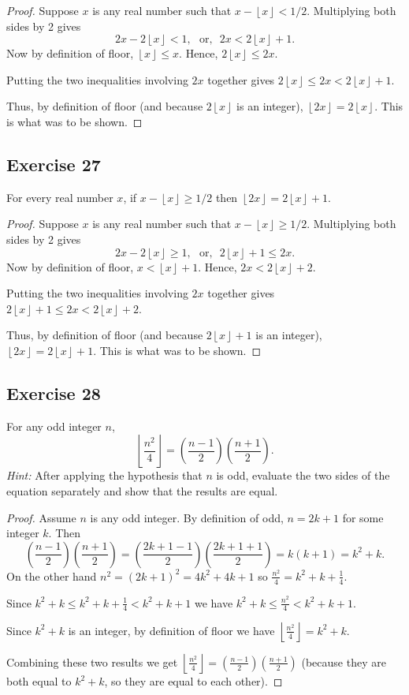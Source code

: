 \documentclass[14pt]{extarticle}
\newcommand{\dps}{\displaystyle}
\newcommand{\floor}[1]{{\left\lfloor#1\right\rfloor}}
\begin{document}
\begin{proof}
Suppose $x$ is any real number such that $x - \floor{x} < 1/2$. Multiplying both sides by 2 gives 
\[
2x - 2\floor{x} < 1, \,\,\text{ or, }\,\, 2x < 2\floor{x} + 1. 
\]
Now by definition of floor, $\floor{x} \leq x$. Hence, $2\floor{x} \leq 2x$. 

Putting the two inequalities involving $2x$ together gives $2\floor{x} \leq 2x < 2\floor{x} + 1$. 

Thus, by definition of floor (and because $2\floor{x}$ is an integer), $\floor{2x} = 2\floor{x}$. This is what was to be shown.
\end{proof}

\subsection{Exercise 27}
For every real number $x$, if $x - \floor{x} \geq 1/2$ then $\floor{2x} = 2\floor{x} + 1$.

\begin{proof}
Suppose $x$ is any real number such that $x - \floor{x} \geq 1/2$. Multiplying both sides by 2 gives 
\[
2x - 2\floor{x} \geq 1, \,\,\text{ or, }\,\, 2\floor{x}+1 \leq 2x. 
\]
Now by definition of floor, $x < \floor{x} + 1$. Hence, $2x < 2\floor{x} + 2$. 

Putting the two inequalities involving $2x$ together gives $2\floor{x} + 1 \leq 2x < 2\floor{x} + 2$. 

Thus, by definition of floor (and because $2\floor{x} + 1$ is an integer), $\floor{2x} = 2\floor{x} + 1$. This is what was to be shown.
\end{proof}

\subsection{Exercise 28}
For any odd integer $n$,
\[
\floor{\frac{n^2}{4}} = \left(\frac{n-1}{2}\right)\left(\frac{n+1}{2}\right).
\]
{\it Hint:} After applying the hypothesis that $n$ is odd, evaluate the two sides of the equation separately and show
that the results are equal.

\begin{proof}
Assume $n$ is any odd integer. By definition of odd, $n = 2k+1$ for some integer $k$. Then
\[
\left(\frac{n-1}{2}\right)\left(\frac{n+1}{2}\right) = \left(\frac{2k+1-1}{2}\right)\left(\frac{2k+1+1}{2}\right) = k(k+1) = k^2+k.
\]
On the other hand $n^2 = (2k+1)^2 = 4k^2+4k+1$ so $\frac{n^2}{4} = k^2+k+\frac{1}{4}$. 

Since $k^2+k \leq k^2+k+\frac{1}{4} < k^2+k+1$ we have $k^2+k \leq \frac{n^2}{4} < k^2+k+1$. 

Since $k^2+k$ is an integer, by definition of floor we have $\dps\floor{\frac{n^2}{4}} = k^2+k$.

Combining these two results we get $\dps\floor{\frac{n^2}{4}} = \left(\frac{n-1}{2}\right)\left(\frac{n+1}{2}\right)$ (because they are both equal to $k^2+k$, so they are equal to each other).
\end{proof}
\end{document}
